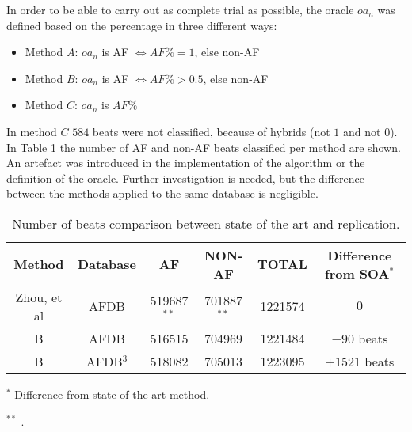 In order to be able to carry out as complete trial as possible, the oracle $oa_n$ was defined based on the percentage in three different ways:
\begin{itemize}
\item Method $A$: $oa_n$ is AF $\iff AF\% = 1$, else non-AF
\item Method $B$: $oa_n$ is AF $\iff AF\% > 0.5$, else non-AF
\item Method $C$: $oa_n$ is $AF\%$
\end{itemize}
In method $C$ $584$ beats were not classified, because of hybrids (not $1$ and not $0$). In Table \ref{table:replication_error} the number of AF and non-AF beats classified per method are shown. An artefact was introduced in the implementation of the algorithm or the definition of the oracle. Further investigation is needed, but the difference between the methods applied to the same database is negligible.
\begin{table}
\begin{center}
\begin{threeparttable}
\caption{Number of beats comparison between state of the art and replication.}
\label{table:replication_error}
\scriptsize
  \begin{tabular}{c c c c c c}
  \toprule
  \textbf{Method} & \textbf{Database} & \textbf{AF} & \textbf{NON-AF} & \textbf{TOTAL} & \textbf{Difference from SOA}$^*$ \\
  \midrule  
  Zhou, et al\cite{zhou2015} & AFDB & 519687$^{**}$ & 701887$^{**}$ & 1221574 & $0$ \\
  B & AFDB & 516515 & 704969 & 1221484 & $-90$ beats\\
  B & AFDB$^3$ & 518082 & 705013 & 1223095 & $+1521$ beats \\
  \bottomrule
\end{tabular}
\begin{tablenotes}
 	\item $^*$ Difference from state of the art method.
 	\item $^{**}$ \cite[p. 9]{zhou2015}.
    \end{tablenotes}
\end{threeparttable}
\end{center}
\end{table}

